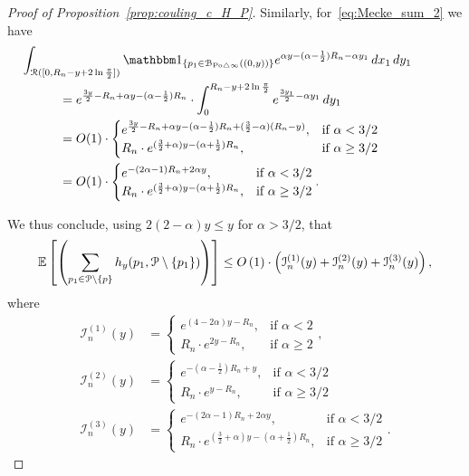 \begin{proof}[Proof of Proposition~\ref{prop:couling_c_H_P}]
Similarly, for~\eqref{eq:Mecke_sum_2} we have
\begin{align*}
	&\hspace{-30pt}\int_{\Rcal ([0, R_n - y + 2 \ln \frac{\pi}{2}])} \ind{p_1 \in \BallSym{(0,y)}} e^{\alpha y - (\alpha - \frac{1}{2})R_n - \alpha y_1} \, dx_1 \, dy_1\\
	&= e^{\frac{3y}{2} - R_n + \alpha y - (\alpha - \frac{1}{2})R_n} 
    	\cdot \int_{0}^{R_n - y + 2 \ln \frac{\pi}{2}} e^{\frac{3y_1}{2}-\alpha y_1} \, dy_1\\
	&= O(1)\cdot 
	\begin{cases} 
	e^{\frac{3y}{2} - R_n + \alpha y - (\alpha - \frac{1}{2})R_n + (\frac{3}{2} - \alpha)(R_n-y)} 
	, & \mbox{if $\alpha < 3/2$} \\ 
	R_n \cdot e^{(\frac{3}{2} +\alpha)y -  (\alpha + \frac{1}{2})R_n}, & \mbox{if 
	$\alpha \geq 3/2$}
	\end{cases}	\\
	&= O(1) \cdot 
	\begin{cases}
	  e^{-(2\alpha-1) R_n + 2 \alpha y}, & \mbox{if $\alpha < 3/2$} \\
	  R_n \cdot e^{(\frac{3}{2} +\alpha)y -  (\alpha + \frac{1}{2})R_n}, & \mbox{if 
	$\alpha \geq 3/2$}
	\end{cases}.
\end{align*}

We thus conclude, using $2(2 - \alpha)y \le y$ for $\alpha > 3/2$, that 
\begin{equation} \label{eq:upper_bound_faulty_edges} 
\mathbb{E}\left[\left( \sum_{p_1 \in {\mathcal P} \setminus\{p\}} 
		h_y (p_1, {\mathcal P} \setminus \{ p_1 \})\right)\right] \le O\left(1\right) \cdot 
\left( \mathcal{I}_n^{(1)}(y) + \mathcal{I}_n^{(2)}(y) + \mathcal{I}_n^{(3)}(y) \right),
\end{equation}
where 
\begin{align*}
 \mathcal{I}_n^{(1)}(y) &= \begin{cases}
	e^{(4-2\alpha) y - R_n}, & \mbox{if $\alpha < 2$} \\
	R_n \cdot e^{2y - R_n}, & \mbox{if $\alpha \geq 2$}
	\end{cases},  \\
	\mathcal{I}_n^{(2)}(y) &= 
	\begin{cases}
	e^{-(\alpha - \frac{1}{2})R_n +y}, & \mbox{if $\alpha < 3/2$} \\
	R_n \cdot  e^{y - R_n}, & \mbox{if $\alpha \geq 3/2$}
	\end{cases}\\
	\mathcal{I}_n^{(3)}(y) &= 
\begin{cases}
	  e^{-(2\alpha-1) R_n + 2 \alpha y}, & \mbox{if $\alpha < 3/2$} \\
	  R_n \cdot e^{(\frac{3}{2} +\alpha)y -  (\alpha + \frac{1}{2})R_n}, & \mbox{if 
	$\alpha \geq 3/2$}
	\end{cases}.
\end{align*}


\end{proof}
